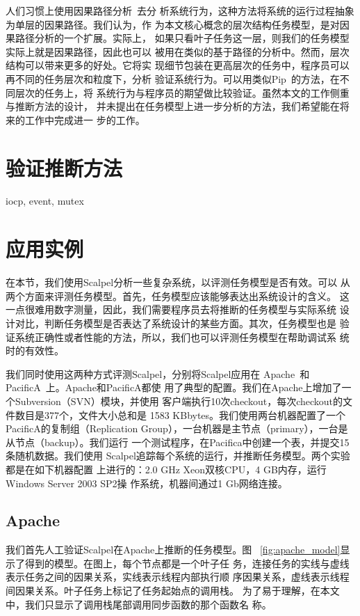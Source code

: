 人们习惯上使用因果路径分析~\cite{pinpoint, project5, pip, magpie}去分
析系统行为，这种方法将系统的运行过程抽象为单层的因果路径。我们认为，作
为本文核心概念的层次结构任务模型，是对因果路径分析的一个扩展。实际上，
如果只看叶子任务这一层，则我们的任务模型实际上就是因果路径，因此也可以
被用在类似的基于路径的分析中。然而，层次结构可以带来更多的好处。它将实
现细节包装在更高层次的任务中，程序员可以再不同的任务层次和粒度下，分析
验证系统行为。可以用类似Pip~\cite{pip}的方法，在不同层次的任务上，将
系统行为与程序员的期望做比较验证。虽然本文的工作侧重与推断方法的设计，
并未提出在任务模型上进一步分析的方法，我们希望能在将来的工作中完成进一
步的工作。

\section{验证推断方法}

iocp, event, mutex

\section{应用实例}

在本节，我们使用Scalpel分析一些复杂系统，以评测任务模型是否有效。可以
从两个方面来评测任务模型。首先，任务模型应该能够表达出系统设计的含义。
这一点很难用数字测量，因此，我们需要程序员去将推断的任务模型与实际系统
设计对比，判断任务模型是否表达了系统设计的某些方面。其次，任务模型也是
验证系统正确性或者性能的方法，所以，我们也可以评测任务模型在帮助调试系
统时的有效性。

我们同时使用这两种方式评测Scalpel，分别将Scalpel应用在
Apache~\cite{apache}和PacificA~\cite{pacifica}上。Apache和PacificA都使
用了典型的配置。我们在Apache上增加了一个Subversion（SVN）模块，并使用
客户端执行10次checkout，每次checkout的文件数目是377个，文件大小总和是
1583 KBbytes。我们使用两台机器配置了一个PacificA的复制组（Replication
Group），一台机器是主节点（primary），一台是从节点（backup）。我们运行
一个测试程序，在Pacifica中创建一个表，并提交15条随机数据。我们使用
Scalpel追踪每个系统的运行，并推断任务模型。两个实验都是在如下机器配置
上进行的：2.0 GHz Xeon双核CPU，4 GB内存，运行Windows Server 2003 SP2操
作系统，机器间通过1 Gb网络连接。

\subsection{Apache}

我们首先人工验证Scalpel在Apache上推断的任务模型。图~
\ref{fig:apache_model}显示了得到的模型。在图上，每个节点都是一个叶子任
务，连接任务的实线与虚线表示任务之间的因果关系，实线表示线程内部执行顺
序因果关系，虚线表示线程间因果关系。叶子任务上标记了任务起始点的调用栈。
为了易于理解，在本文中，我们只显示了调用栈尾部调用同步函数的那个函数名
称。

